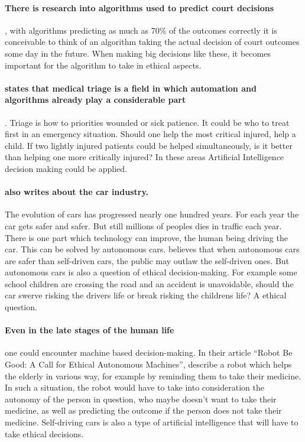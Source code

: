 \documentclass[11pt]{article}
\begin{document}
\paragraph{There is research into algorithms used to predict court decisions}
\cite{martin2004competing}, with algorithms predicting as much
as 70\% of the outcomes correctly \cite{Kravets2014Court} it is
conceivable to think of an algorithm taking the actual decision of court
outcomes some day in the future. When making big decisions like these, it
becomes important for the algorithm to take in ethical aspects.

\paragraph{ states that medical triage is a field in which automation and algorithms already play a considerable part}. Triage is how to priorities wounded or sick patience. It could be who to treat first in an emergency situation. Should one help the most critical injured, help a child. If two lightly injured patients could be helped simultaneously, is it better than helping one more critically injured? In these areas Artificial Intelligence decision making could be applied.

\paragraph{\citeauthor{Chatfield2014automate} also writes about the car industry.} The evolution of cars has progressed nearly one hundred years. For each year the car gets safer and safer. But still millions of peoples dies in traffic each year. There is one part which technology can improve, the human being driving the car. This can be solved by autonomous cars. \citeauthor{elonmuskTweet} believes that when autonomous cars are safer than self-driven cars, the public may outlaw the self-driven ones. But autonomous cars is also a question of ethical decision-making. For example some school children are crossing the road and an accident is unavoidable, should the car swerve risking the drivers life or break risking the childrens life? A ethical question.

\paragraph{Even in the late stages of the human life} one could encounter machine based decision-making. In their article “Robot Be Good: A Call for Ethical Autonomous
Machines”, \citeauthor{anderson2010robot} describe a robot which
helps the elderly in various way, for example by reminding them to take their
medicine. In such a situation, the robot would have to take into consideration
the autonomy of the person in question, who maybe doesn't want to take their
medicine, as well as predicting the outcome if the person does not take their
medicine. Self-driving cars is also a type of artificial intelligence that will
have to take ethical decisions.
\end{document}

